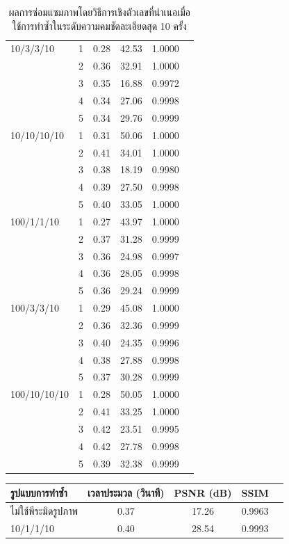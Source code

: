 \documentclass[hidelinks, a4paper,12pt]{article}
\numberwithin{equation}{section}							%
\numberwithin{equation}{section}
\begin{document}
{\begin{table}[H]
\begin{tabular}[ht]{|l|c|c|c|c|c|}
			\hline
			10/3/3/10  & 1 & 0.28 & 42.53 & 1.0000\\
			& 2 & 0.36 & 32.91 & 1.0000 \\
			& 3 & 0.35 & 16.88 & 0.9972 \\
			& 4 & 0.34 & 27.06 &  0.9998 \\
			& 5 & 0.34 & 29.76 & 0.9999 \\
			\hline
			10/10/10/10  & 1 & 0.31 & 50.06 & 1.0000 \\
			& 2 & 0.41 & 34.01 & 1.0000\\
			& 3 & 0.38 & 18.19 & 0.9980\\
			& 4 & 0.39 & 27.50 & 0.9998\\
			& 5 & 0.40 & 33.05 &  1.0000\\
			\hline
			100/1/1/10  & 1 & 0.27 & 43.97 & 1.0000 \\
			& 2 & 0.37  & 31.28 & 0.9999\\
			& 3 & 0.36 & 24.98 & 0.9997\\
			& 4 & 0.36  &28.05 & 0.9998\\
			& 5 & 0.36 & 29.24 & 0.9999 \\
			\hline
			100/3/3/10  & 1 & 0.29 & 45.08& 1.0000 \\
			& 2 & 0.36 & 32.36 & 0.9999\\
			& 3 & 0.40 & 24.35 & 0.9996\\
			& 4 & 0.38 & 27.88 & 0.9998\\
			& 5 & 0.37 & 30.28 & 0.9999 \\
			\hline
			100/10/10/10  & 1 & 0.28 & 50.05 &  1.0000\\
			& 2 & 0.41 & 33.25 &  1.0000\\
			& 3 & 0.42 & 23.51 & 0.9995 \\
			& 4 & 0.42 & 27.78 & 0.9998 \\
			& 5 & 0.39 & 32.38 & 0.9999 \\
			\hline
		\end{tabular}
		\caption{ผลการซ่อมแซมภาพโดยวิธีการเชิงตัวเลขที่นำเนอเมื่อใช้การทำซ้ำในระดับความคมชัดละเอียดสุด 10 ครั้ง}
		\label{result:table-multiresolution2}
	\end{table}	
	\begin{table}[H]
		\centering
		\begin{tabular}[ht]{|l|c|c|c|c|}
			\hline
			รูปแบบการทำซ้ำ  & เวลาประมวล  (วินาที) & PSNR (dB) & SSIM \\
			\hline
			ไม่ใช้พีระมิดรูปภาพ & 0.37 & 17.26 & 0.9963  \\
			10/1/1/10 & 0.40 & 28.54 & 0.9993 \\

\end{tabular}
\end{table}}
\end{document}
